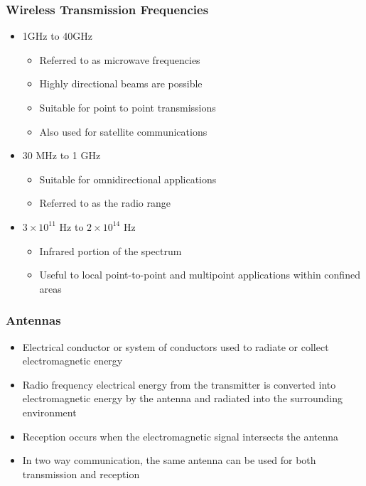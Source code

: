 \documentclass[pdflatex,compress]{beamer}
\begin{document}
\begin{frame}
	\frametitle{Wireless Transmission Frequencies}
	\begin{itemize}
		\item 1GHz to 40GHz
		\begin{itemize}
			\item Referred to as microwave frequencies
			\item Highly directional beams are possible
			\item Suitable for point to point transmissions
			\item Also used for satellite communications
		\end{itemize}
		\item 30 MHz to 1 GHz
		\begin{itemize}
			\item Suitable for omnidirectional applications
			\item Referred to as the radio range
		\end{itemize}
		\item $ 3 \times 10^{11} $ Hz to $ 2 \times 10^{14} $ Hz
		\begin{itemize}
			\item Infrared portion of the spectrum
			\item Useful to local point-to-point and multipoint applications within confined areas
		\end{itemize}
	\end{itemize}
\end{frame}

\begin{frame}
	\frametitle{Antennas}
	\begin{itemize}
		\item Electrical conductor or system of conductors used to radiate or collect electromagnetic energy
		\item Radio frequency electrical energy from the transmitter is converted into electromagnetic energy by the antenna and radiated into the surrounding environment
		\item Reception occurs when the electromagnetic signal intersects the antenna
		\item In two way communication, the same antenna can be used for both transmission and reception
	\end{itemize}
\end{frame}
\end{document}
